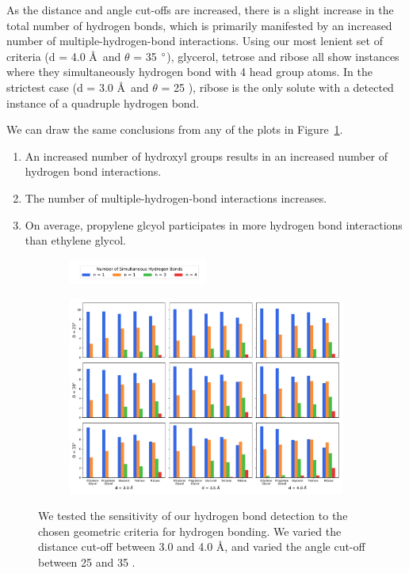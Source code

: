\documentclass{article}
\begin{document}
  As the distance and angle cut-offs are increased, there is a slight increase in the total
  number of hydrogen bonds, which is primarily manifested by an increased number of multiple-hydrogen-bond
  interactions. Using our most lenient set of criteria (d = 4.0 \AA~and $\theta$ = 35 $\degree$), glycerol,
  tetrose and ribose all show instances where they simultaneously hydrogen bond with 4 head group atoms.
  In the strictest case (d = 3.0 \AA~and $\theta$ = 25 \degree), ribose is the only solute with a 
  detected instance of a quadruple hydrogen bond.
  
  We can draw the same conclusions from any of the plots in Figure~\ref{fig:hbond_sensitivity}. 
  \begin{enumerate}
    \item An increased number of hydroxyl groups results in an increased number of hydrogen bond
    interactions.
    \item The number of multiple-hydrogen-bond interactions increases.
    \item On average, propylene glcyol participates in more hydrogen bond interactions than 
    ethylene glycol.  %
  \end{enumerate}
  
  \begin{figure}[!htb]
  \centering
  \begin{subfigure}{\textwidth}
  \centering
  \includegraphics[trim={0 0.5cm 0.5cm 0.5cm}, clip, width=0.5\textwidth]{hbond_sensitivity_legend.pdf}
  \end{subfigure}
  \begin{subfigure}{\textwidth}
  \includegraphics[width=\textwidth]{hbond_sensitivity.pdf}
  \end{subfigure}
  \caption{We tested the sensitivity of our hydrogen bond detection to the chosen 
  geometric criteria for hydrogen bonding. We varied the distance cut-off between 3.0 and
  4.0 \AA, and varied the angle cut-off between 25 and 35 \degree.}\label{fig:hbond_sensitivity}
  \end{figure}
  
\end{document}
